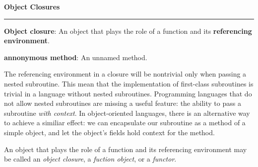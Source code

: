 \nopagenumbers
{\bf Object Closures}
\vskip 1mm
\hrule

\vskip 6pt
{\bf Object closure}: An object that plays the role of a function and its {\bf referencing environment}.

\vskip 6pt
{\bf annonymous method}: An unnamed method.

\vskip 6pt
The referencing environment in a closure will be nontrivial only when passing a nested subroutine. This mean that the implementation of first-class subroutines is trivial in a language without nested subroutines. Programming languages that do not allow nested subroutines are missing a useful feature: the ability to pass a subroutine {\it with context}. In object-oriented languages, there is an alternative way to achieve a similiar effect: we can encapsulate our subroutine as a method of a simple object, and let the object's fields hold context for the method.

\vskip 6pt
An object that plays the role of a function and its referencing environment may be called an {\it object closure}, a {\it fuction object}, or a {\it functor}.

\vfill\eject
\bye
